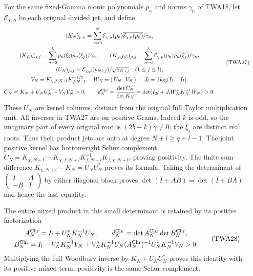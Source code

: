 For the same fixed-Gamma monic polynomials $p_n$ and
norms $\gamma_n$ of TWA18, let $\mathcal E_{\chi,\mu}$
be each original divided jet, and define
\[
\begin{gathered}
 (K_N)_{\mu,\nu}
 =\sum_{n=0}^N\mathcal E_{\chi,\mu}(p_n)
      \overline{\mathcal E_{\chi,\nu}(p_n)}/\gamma_n,\\
 (K_{f,L})_{i,j}
 =\sum_{n=0}^L p_n(\xi_i)\overline{p_n(\xi_j)}/\gamma_n,\qquad
 (K_{\chi,f;L})_{\mu,j}
 =\sum_{n=0}^L\mathcal E_{\chi,\mu}(p_n)
                         \overline{p_n(\xi_j)}/\gamma_n,\\
 (U_N)_{\mu,j}=\mathcal E_{\chi,\mu}(p_{N+j})
                               /\sqrt{\gamma_{N+j}}\quad(1\leq j\leq l),\\
 V_N=K_{\chi,f;N+l}K_{f,N+l}^{-1/2},\quad
 W_N=(\,U_N\ \ V_N\,),\quad J_l=\operatorname{diag}(I_l,-I_l),\\
 C_N=K_N+U_NU_N^*-V_NV_N^*>0,\qquad
 d_N^{\rm Chr}=\frac{\det C_N}{\det K_N}
       =\det(I_{2l}+J_lW_N^*K_N^{-1}W_N)>0.
\end{gathered}\tag{TWA27}
\]
These $U_N$ are kernel columns, distinct from the original
full Taylor multiplication unit. All inverses in TWA27
are on positive Grams. Indeed $k$ is odd, so the imaginary
part of every original root is $(2b-k)\gamma\ne0$;
the $\xi_j$ are distinct real roots. Thus their product
jets are onto at degree $N+l\geq q+l-1$. The joint
positive kernel has bottom-right Schur complement
$C_N=K_{\chi,N+l}-K_{\chi,f;N+l}
K_{f,N+l}^{-1}K_{f,\chi;N+l}$, proving positivity.
The finite sum difference
$K_{\chi,N+l}-K_N=U_NU_N^*$ proves its formula.
Taking the determinant of
$\left(\begin{smallmatrix}I&A\\-B&I\end{smallmatrix}\right)$
by either diagonal block proves
$\det(I+AB)=\det(I+BA)$ and hence the last equality.

The entire mixed product in this small determinant is
retained by its positive factorization
\[
\begin{gathered}
 A_N^{\rm Chr}=I_l+U_N^*K_N^{-1}U_N,\qquad
 d_N^{\rm Chr}=\det A_N^{\rm Chr}\det B_N^{\rm Chr},\\
 B_N^{\rm Chr}=I_l-V_N^*K_N^{-1}V_N
 +V_N^*K_N^{-1}U_N(A_N^{\rm Chr})^{-1}U_N^*K_N^{-1}V_N>0.
\end{gathered}\tag{TWA28}
\]
Multiplying the full Woodbury inverse by
$K_N+U_NU_N^*$ proves this identity with its positive
mixed term; positivity is the same Schur complement.

